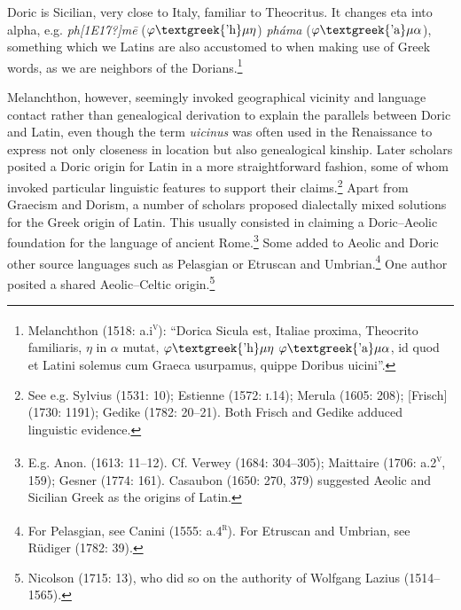 \documentclass[12pt]{article}
\newenvironment{styleStandard}{\renewcommand\baselinestretch{1.25}\setlength\leftskip{0in}\setlength\rightskip{0in}\setlength\parindent{0.1972in}\setlength\parfillskip{0pt plus 1fil}\setlength\parskip{0in plus 1pt}\writerlistparindent\writerlistleftskip\leavevmode\normalfont\normalsize\writerlistlabel\ignorespaces}{\unskip\vspace{0in plus 1pt}\par}
\newenvironment{styleQuote}{\renewcommand\baselinestretch{1.25}\setlength\leftskip{0.3937in}\setlength\rightskip{0in}\setlength\parindent{0in}\setlength\parfillskip{0pt plus 1fil}\setlength\parskip{0.1665in plus 0.016649999in}\writerlistparindent\writerlistleftskip\leavevmode\normalfont\normalsize\writerlistlabel\ignorespaces}{\unskip\vspace{0.1665in plus 0.016649999in}\par}
\newcommand\writerlistleftskip{}
\newcommand\writerlistparindent{}
\newcommand\writerlistlabel{}
\begin{document}
\begin{styleQuote}
Doric is Sicilian, very close to Italy, familiar to Theocritus. It changes eta into alpha, e.g. \textit{ph[1E17?]m\=e }($\varphi \text{\textgreek{'h}}\mu \eta $) \textit{pháma} ($\varphi \text{\textgreek{'a}}\mu \alpha $), something which we Latins are also accustomed to when making use of Greek words, as we are neighbors of the Dorians.\footnote{ Melanchthon (1518: a.i\textsc{\textsuperscript{v}}): “Dorica Sicula est, Italiae proxima, Theocrito familiaris, $\eta $ in $\alpha $ mutat, $\varphi \text{\textgreek{'h}}\mu \eta $ $\varphi \text{\textgreek{'a}}\mu \alpha $, id quod et Latini solemus cum Graeca usurpamus, quippe Doribus uicini”.}
\end{styleQuote}

\begin{styleStandard}
Melanchthon, however, seemingly invoked geographical vicinity and language contact rather than genealogical derivation to explain the parallels between Doric and Latin, even though the term \textit{uicinus} was often used in the Renaissance to express not only closeness in location but also genealogical kinship. Later scholars posited a Doric origin for Latin in a more straightforward fashion, some of whom invoked particular linguistic features to support their claims.\footnote{ See e.g. Sylvius (1531: 10); Estienne (1572: \textsc{i.}14); Merula (1605: 208); [Frisch] (1730: 1191); Gedike (1782: 20–21). Both Frisch and Gedike adduced linguistic evidence.} Apart from Graecism and Dorism, a number of scholars proposed dialectally mixed solutions for the Greek origin of Latin. This usually consisted in claiming a Doric–Aeolic foundation for the language of ancient Rome.\footnote{ E.g. Anon. (1613: 11–12). Cf. Verwey (1684: 304–305); Maittaire (1706: a.2\textsc{\textsuperscript{v}}, 159); Gesner (1774: 161). Casaubon (1650: 270, 379) suggested Aeolic and Sicilian Greek as the origins of Latin.} Some added to Aeolic and Doric other source languages such as Pelasgian or Etruscan and Umbrian.\footnote{ For Pelasgian, see Canini (1555: a.4\textsc{\textsuperscript{r}}). For Etruscan and Umbrian, see Rüdiger (1782: 39).} One author posited a shared Aeolic–Celtic origin.\footnote{ Nicolson (1715: 13), who did so on the authority of Wolfgang Lazius (1514–1565).}
\end{styleStandard}
\end{document}
